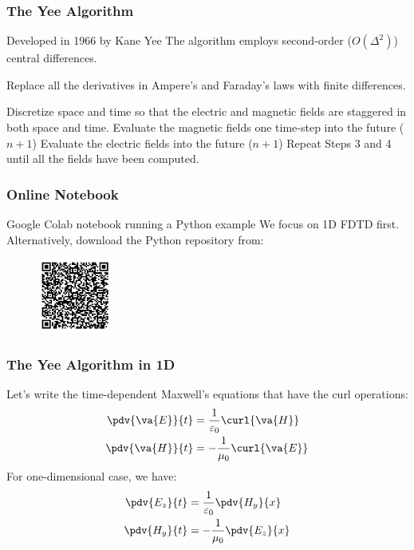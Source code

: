 \documentclass[10pt]{beamer}
\newcommand{\E}{\varepsilon}  %
\renewcommand{\u}{\mu}  %
\begin{document}
\begin{frame}
    \frametitle{The Yee Algorithm}
    \begin{outline}
        \1 Developed in 1966 by Kane Yee
        \1 The algorithm employs second-order ($O(\Delta^2)$) central differences.
    \end{outline}
    \begin{outline}[enumerate]
        \1 Replace all the derivatives in Ampere's and Faraday's laws with finite differences.

        \2 Discretize space and time so that the electric and magnetic fields are staggered in both space and time.
        \1 Evaluate the magnetic fields one time-step into the future ($n+1$)
        \1 Evaluate the electric fields into the future ($n +  1$)
        \1 Repeat Steps 3 and 4 until all the fields have been computed.
    \end{outline}
\end{frame}

\begin{frame}
    \frametitle{Online Notebook}
    \begin{outline}
        \1 Google Colab notebook running a Python example
        \1 We focus on 1D FDTD first.
        \1 Alternatively, download the Python repository from:
    \end{outline}
    \begin{figure}[h!]
        \centering
        \includegraphics[width=.6\textwidth]{qrcode.pdf}
    \end{figure}
\end{frame}

\begin{frame}
    \frametitle{The Yee Algorithm in 1D}
    Let's write the time-dependent Maxwell's equations that have the curl operations:
    \begin{align*}
        \pdv{\va{E}}{t} & = \frac{1}{\E_0} \curl{\va{H}}  \\
        \pdv{\va{H}}{t} & = -\frac{1}{\u_0} \curl{\va{E}}
    \end{align*}
    For one-dimensional case, we have:
    \begin{align*}
        \pdv{{E_z}}{t} & = \frac{1}{\E_0} \pdv{H_y}{x}  \\
        \pdv{{H_y}}{t} & = -\frac{1}{\u_0} \pdv{E_z}{x}
    \end{align*}


\end{frame}
\end{document}
